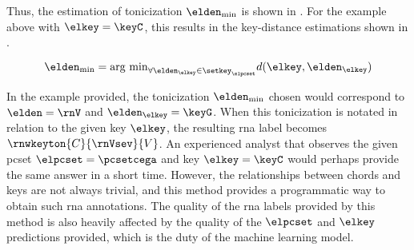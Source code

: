
Thus, the estimation of tonicization $\elden_{\min}$ is
shown in . For the example
above with $\elkey = \keyC$, this results in the
key-distance estimations shown in
.

\begin{equation}
    \label{eq:tonicization_estimation}
    \elden_{\min} = \text{arg min}_{\forall \elden_\elkey \in \setkey_\elpcset} d(\elkey, \elden_\elkey)
\end{equation}


In the example provided, the tonicization $\elden_{\min}$
chosen would correspond to $\elden = \rnV$ and
$\elden_\elkey = \keyG$. When this tonicization is notated
in relation to the given key $\elkey$, the resulting
\gls{rna} label becomes $\rnwkeyton{C}{\rnVsev}{V}$. An
experienced analyst that observes the given \gls{pcset}
$\elpcset = \pcsetcega$ and key $\elkey = \keyC$ would
perhaps provide the same answer in a short time. 
However, the relationships between chords and keys are not
always trivial, and this method provides a programmatic way
to obtain such \gls{rna} annotations. The quality of the
\gls{rna} labels provided by this method is also heavily
affected by the quality of the $\elpcset$ and $\elkey$
predictions provided, which is the duty of the machine
learning model.
